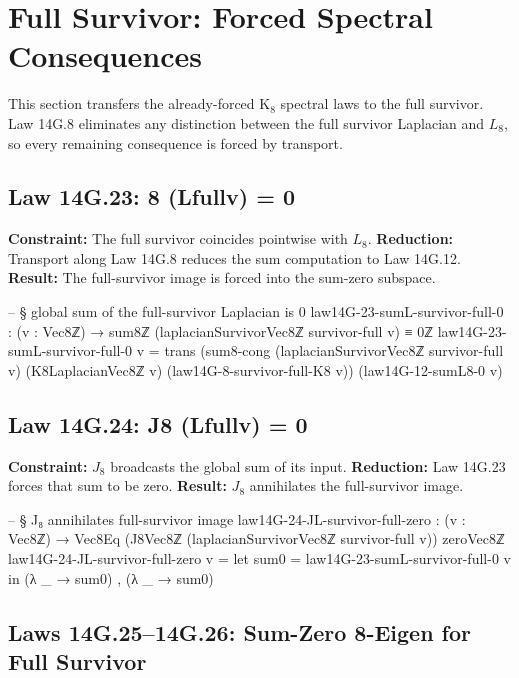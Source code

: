 \documentclass[11pt,a4paper]{book}
\def\Sigma{Sigma}%
\def\Leftrightarrow{<=>}%
\def\mathrm#1{#1}%
\def\texorpdfstring#1#2{#2}%
\begin{document}
\section{Full Survivor: Forced Spectral Consequences}

This section transfers the already-forced K$_8$ spectral laws to the full survivor.
Law 14G.8 eliminates any distinction between the full survivor Laplacian and $L_8$, so every remaining consequence is forced by transport.

\subsection{Law 14G.23: \texorpdfstring{$\Sigma_8 (L_{\mathrm{full}}\,v) = 0$}{8 (Lfullv) = 0}}

\textbf{Constraint:} The full survivor coincides pointwise with $L_8$.
\textbf{Reduction:} Transport along Law 14G.8 reduces the sum computation to Law 14G.12.
\textbf{Result:} The full-survivor image is forced into the sum-zero subspace.

\begin{code}
-- § global sum of the full-survivor Laplacian is 0
law14G-23-sumL-survivor-full-0 : (v : Vec8ℤ) → sum8ℤ (laplacianSurvivorVec8ℤ survivor-full v) ≡ 0ℤ
law14G-23-sumL-survivor-full-0 v =
  trans
    (sum8-cong (laplacianSurvivorVec8ℤ survivor-full v) (K8LaplacianVec8ℤ v) (law14G-8-survivor-full-K8 v))
    (law14G-12-sumL8-0 v)
\end{code}

\subsection{Law 14G.24: \texorpdfstring{$J_8 (L_{\mathrm{full}}\,v) = 0$}{J8 (Lfullv) = 0}}

\textbf{Constraint:} $J_8$ broadcasts the global sum of its input.
\textbf{Reduction:} Law 14G.23 forces that sum to be zero.
\textbf{Result:} $J_8$ annihilates the full-survivor image.

\begin{code}
-- § J₈ annihilates full-survivor image
law14G-24-JL-survivor-full-zero : (v : Vec8ℤ) → Vec8Eq (J8Vec8ℤ (laplacianSurvivorVec8ℤ survivor-full v)) zeroVec8ℤ
law14G-24-JL-survivor-full-zero v =
  let sum0 = law14G-23-sumL-survivor-full-0 v in
  (λ _ → sum0) , (λ _ → sum0)
\end{code}

\subsection{Laws 14G.25--14G.26: Sum-Zero \texorpdfstring{$\Leftrightarrow$}{} 8-Eigen for Full Survivor}
\end{document}
